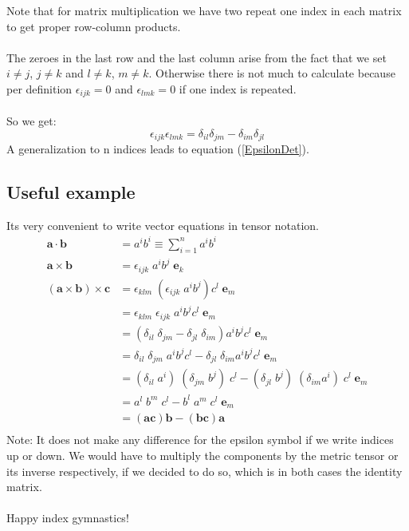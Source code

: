 \documentclass[11pt, oneside]{article}   	%
\begin{document}
Note that for matrix multiplication we have two repeat one index in each matrix to get proper 
row-column products. \\
\\
The zeroes in the last row and the last column arise from the fact that we set $i \neq j$, $j \neq k$
and $ l \neq k$, $m \neq k$. Otherwise there is not much to calculate because per definition 
$\epsilon_{ijk} = 0$ and $\epsilon_{lmk} = 0$ if one index is repeated. \\
\\
So we get:
\begin{equation}
    \epsilon_{ijk}\epsilon_{lmk} = \delta_{il} \delta_{jm} - \delta_{im} \delta_{jl}
\end{equation}
A generalization to n indices leads to equation (\ref{EpsilonDet}).
%
\subsection{Useful example}
Its very convenient to write vector equations in tensor notation.
\begin{equation}
    \begin{aligned}
        \mathbf{a} \cdot \mathbf{b} &= a^i b^i \equiv \sum_{i=1}^n a^i b^i  \\
        \mathbf{a} \times \mathbf{b} &= \epsilon_{ijk} \; a^i b^j \; \mathbf{e}_k \\
        (\mathbf{a} \times \mathbf{b}) \times \mathbf{c} &= \epsilon_{klm} \; (\epsilon_{ijk} \; a^i b^j) c^l \; \mathbf{e}_m \\
            &= \epsilon_{klm} \; \epsilon_{ijk} \; a^i b^j c^l \; \mathbf{e}_m \\
            &= (\delta_{il}\;\delta_{jm} - \delta_{jl}\;\delta_{im}) a^i b^j c^l \; \mathbf{e}_m \\
            &= \delta_{il}\;\delta_{jm}\;a^i b^j c^l - \delta_{jl}\;\delta_{im} a^i b^j c^l \; \mathbf{e}_m \\
            &= (\delta_{il}\;a^i)\;(\delta_{jm}\;b^j)\;c^l - (\delta_{jl}\;b^j)\;(\delta_{im} a^i)\;c^l \; \mathbf{e}_m \\
            &= a^l\;b^m\;c^l - b^l\;a^m\;c^l \; \mathbf{e}_m \\
            &= (\mathbf{a}\mathbf{c})\mathbf{b} - (\mathbf{b}\mathbf{c})\mathbf{a} \\
    \end{aligned}
\end{equation}
Note: It does not make any difference for the epsilon symbol if we write indices up or down. We would have
to multiply the components by the metric tensor or its inverse respectively, if we decided to do so, which 
is in both cases the identity matrix.
\paragraph{}
Happy index gymnastics!
\end{document}
